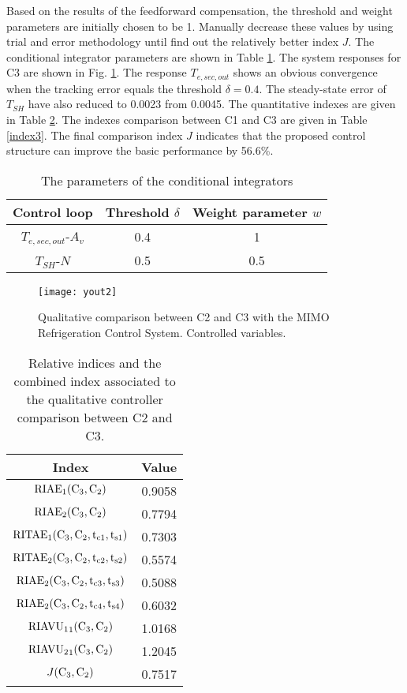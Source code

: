 \documentclass{ifacconf}
\begin{document}
Based on the results of the feedforward compensation, the threshold and weight parameters are initially chosen to be 1. Manually decrease these values by using trial and error methodology until find out the relatively better index $J$. The conditional integrator parameters are shown in Table \ref{CIpara}. The system responses for C3 are shown in Fig. \ref{yout2}. The response $T_{e,sec,out}$ shows an obvious convergence when the tracking error equals the threshold $\delta =0.4$. The steady-state error of $T_{SH}$ have also reduced to 0.0023 from 0.0045. The quantitative indexes are given in Table \ref{index2}. The indexes comparison between C1 and C3 are given in Table \ref{index3}. The final comparison index $J$ indicates that the proposed control structure can improve the basic performance by 56.6\%.

\begin{table}[htb]
\centering
\caption{The parameters of the conditional integrators}
\label{CIpara}
\begin{tabular}{|c|c|c|}
\hline
 Control loop& Threshold $\delta$ & Weight parameter $w$ \\ \hline
 $T_{e,sec,out}$-$A_v$  & 0.4 & 1 \\ \hline
 $T_{SH}$-$N$& 0.5 & 0.5 \\ \hline
\end{tabular}
\end{table}


\begin{figure}
\begin{center}
\texttt{[image: yout2]}    %
\caption{Qualitative comparison between C2 and C3 with the MIMO Refrigeration Control System. Controlled variables.}
\label{yout2}
\end{center}
\end{figure}




\begin{table}[htb]
\begin{center}
\caption{Relative indices and the combined index associated to the qualitative controller
comparison between C2 and C3.}\label{index2}
\begin{tabular}{cc}
Index & Value\\\hline
${\rm{RIAE}}_1({\rm{C_3,C_2}})$ & 0.9058 \\
${\rm{RIAE}}_2({\rm{C_3,C_2}})$ & 0.7794 \\
${\rm{RITAE}}_1({\rm{C_3,C_2,t_{c1},t_{s1}}})$ & 0.7303 \\
${\rm{RITAE}}_2({\rm{C_3,C_2,t_{c2},t_{s2}}})$ & 0.5574 \\
${\rm{RIAE}}_2({\rm{C_3,C_2,t_{c3},t_{s3}}})$ & 0.5088 \\
${\rm{RIAE}}_2({\rm{C_3,C_2,t_{c4},t_{s4}}})$ & 0.6032 \\
${\rm{RIAVU_1}}_1({\rm{C_3,C_2}})$ & 1.0168 \\
${\rm{RIAVU_2}}_1({\rm{C_3,C_2}})$ & 1.2045 \\ \hline
$J({\rm{C_3,C_2}})$ & 0.7517 \\ \hline
\end{tabular}
\end{center}
\end{table}
\end{document}
